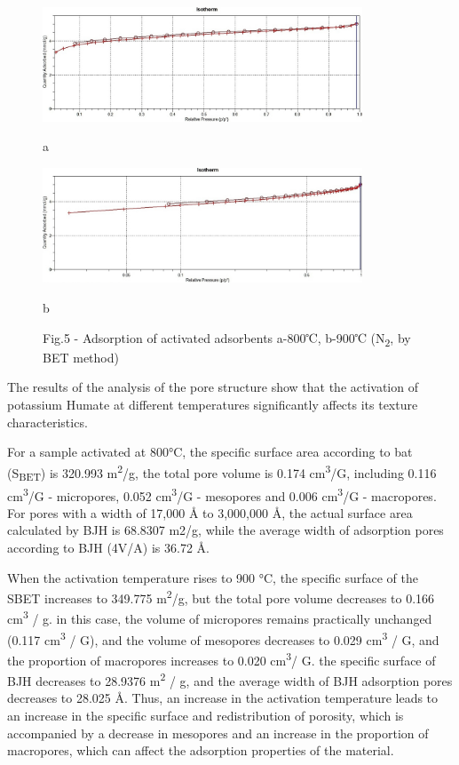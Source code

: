 \begin{figure}[H]
	\centering
	\includegraphics[width=0.85\textwidth]{media/chem2/image103}
	\caption*{a}
	\includegraphics[width=0.85\textwidth]{media/chem2/image103.1}
	\caption*{b}
	\caption*{Fig.5 - Adsorption of activated adsorbents a-800℃, b-900℃ (N\textsubscript{2}, by BET method)}
\end{figure}

\begin{multicols}{2}
The results of the analysis of the pore structure show that the
activation of potassium Humate at different temperatures significantly
affects its texture characteristics.

For a sample activated at 800°C, the specific surface area according to
bat (S\textsubscript{BET}) is 320.993 m\textsuperscript{2}/g, the total
pore volume is 0.174 cm\textsuperscript{3}/G, including 0.116
cm\textsuperscript{3}/G - micropores, 0.052 cm\textsuperscript{3}/G -
mesopores and 0.006 cm\textsuperscript{3}/G - macropores. For pores with
a width of 17,000 Å to 3,000,000 Å, the actual surface area calculated
by BJH is 68.8307 m2/g, while the average width of adsorption pores
according to BJH (4V/A) is 36.72 Å.

When the activation temperature rises to 900 °C, the specific surface of
the SBET increases to 349.775 m\textsuperscript{2}/g, but the total pore
volume decreases to 0.166 cm\textsuperscript{3} / g. in this case, the
volume of micropores remains practically unchanged (0.117
cm\textsuperscript{3} / G), and the volume of mesopores decreases to
0.029 cm\textsuperscript{3} / G, and the proportion of macropores
increases to 0.020 cm\textsuperscript{3}/ G. the specific surface of BJH
decreases to 28.9376 m\textsuperscript{2} / g, and the average width of
BJH adsorption pores decreases to 28.025 Å. Thus, an increase in the
activation temperature leads to an increase in the specific surface and
redistribution of porosity, which is accompanied by a decrease in
mesopores and an increase in the proportion of macropores, which can
affect the adsorption properties of the material.
\end{multicols}

